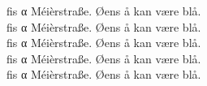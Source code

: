 \documentclass[a4paper,10pt]{article}
\begin{document}


									 fis α Méièrstraße. Øens å kan være blå.\\
\setmainfont{latin modern roman}     fis α Méièrstraße. Øens å kan være blå.\\
\setmainfont{latin modern math}      fis α Méièrstraße. Øens å kan være blå.\\
\setmainfont{CMUSerif}               fis α Méièrstraße. Øens å kan være blå.\\
\setmainfont{New Computer Modern 10} fis α Méièrstraße. Øens å kan være blå.\\
\end{document}
